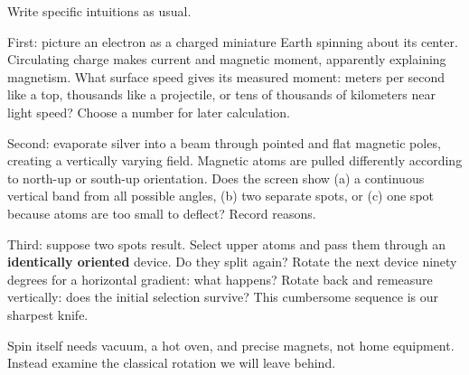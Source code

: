 
Write specific intuitions as usual.

First: picture an electron as a charged miniature Earth spinning about its center. Circulating charge makes current and magnetic moment, apparently explaining magnetism. What surface speed gives its measured moment: meters per second like a top, thousands like a projectile, or tens of thousands of kilometers near light speed? Choose a number for later calculation.

Second: evaporate silver into a beam through pointed and flat magnetic poles, creating a vertically varying field. Magnetic atoms are pulled differently according to north-up or south-up orientation. Does the screen show (a) a continuous vertical band from all possible angles, (b) two separate spots, or (c) one spot because atoms are too small to deflect? Record reasons.

Third: suppose two spots result. Select upper atoms and pass them through an \textbf{identically oriented} device. Do they split again? Rotate the next device ninety degrees for a horizontal gradient: what happens? Rotate back and remeasure vertically: does the initial selection survive? This cumbersome sequence is our sharpest knife.


Spin itself needs vacuum, a hot oven, and precise magnets, not home equipment. Instead examine the classical rotation we will leave behind.

